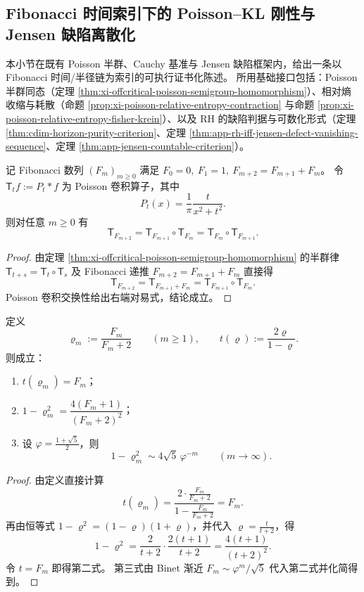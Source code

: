 \subsection{Fibonacci 时间索引下的 Poisson--KL 刚性与 Jensen 缺陷离散化}\label{subsec:cdim-fibonacci-poisson-kl-rh-discretization}
本小节在既有 Poisson 半群、Cauchy 基准与 Jensen 缺陷框架内，给出一条以 Fibonacci 时间/半径链为索引的可执行证书化陈述。
所用基础接口包括：Poisson 半群同态（定理 \ref{thm:xi-offcritical-poisson-semigroup-homomorphism}）、相对熵收缩与耗散（命题 \ref{prop:xi-poisson-relative-entropy-contraction} 与命题 \ref{prop:xi-poisson-relative-entropy-fisher-krein}）、以及 RH 的缺陷判据与可数化形式（定理 \ref{thm:cdim-horizon-purity-criterion}、定理 \ref{thm:app-rh-iff-jensen-defect-vanishing-sequence}、定理 \ref{thm:app-jensen-countable-criterion}）。

\begin{conclusion}\label{con:cdim-fibonacci-poisson-semigroup-factorization}
记 Fibonacci 数列 \((F_m)_{m\ge 0}\) 满足
\(
F_0=0,\ F_1=1,\ F_{m+2}=F_{m+1}+F_m
\)。
令 \(\mathsf T_t f:=P_t*f\) 为 Poisson 卷积算子，其中
\[
P_t(x)=\frac1\pi\frac{t}{x^2+t^2}.
\]
则对任意 \(m\ge 0\) 有
\[
\mathsf T_{F_{m+2}}
=
\mathsf T_{F_{m+1}}\circ \mathsf T_{F_m}
=
\mathsf T_{F_m}\circ \mathsf T_{F_{m+1}}.
\]
\end{conclusion}
\begin{proof}
由定理 \ref{thm:xi-offcritical-poisson-semigroup-homomorphism} 的半群律
\(
\mathsf T_{t+s}=\mathsf T_t\circ\mathsf T_s
\)
及 Fibonacci 递推
\(
F_{m+2}=F_{m+1}+F_m
\)
直接得
\[
\mathsf T_{F_{m+2}}
=
\mathsf T_{F_{m+1}+F_m}
=
\mathsf T_{F_{m+1}}\circ\mathsf T_{F_m}.
\]
Poisson 卷积交换性给出右端对易式，结论成立。
\end{proof}

\begin{conclusion}\label{con:cdim-fibonacci-radius-time-conjugacy}
定义
\[
\varrho_m:=\frac{F_m}{F_m+2}\qquad(m\ge 1),
\qquad
t(\varrho):=\frac{2\varrho}{1-\varrho}.
\]
则成立：
\begin{enumerate}
  \item \(t(\varrho_m)=F_m\)；
  \item \(1-\varrho_m^2=\dfrac{4(F_m+1)}{(F_m+2)^2}\)；
  \item 设 \(\varphi=\frac{1+\sqrt5}{2}\)，则
  \[
  1-\varrho_m^2\sim 4\sqrt5\,\varphi^{-m}\qquad(m\to\infty).
  \]
\end{enumerate}
\end{conclusion}
\begin{proof}
由定义直接计算
\[
t(\varrho_m)
=
\frac{2\cdot \frac{F_m}{F_m+2}}{1-\frac{F_m}{F_m+2}}
=
F_m.
\]
再由恒等式 \(1-\varrho^2=(1-\varrho)(1+\varrho)\)，并代入 \(\varrho=\frac{t}{t+2}\)，得
\[
1-\varrho^2
=
\frac{2}{t+2}\cdot\frac{2(t+1)}{t+2}
=
\frac{4(t+1)}{(t+2)^2}.
\]
令 \(t=F_m\) 即得第二式。
第三式由 Binet 渐近 \(F_m\sim \varphi^m/\sqrt5\) 代入第二式并化简得到。
\end{proof}

